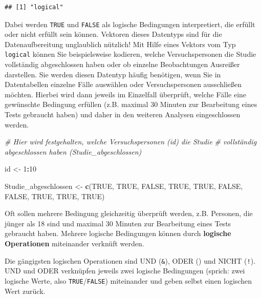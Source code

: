 \documentclass[
  ngerman,
]{book}
\newenvironment{Shaded}{\begin{snugshade}}{\end{snugshade}}
\newcommand{\CommentTok}[1]{\textcolor[rgb]{0.56,0.35,0.01}{\textit{#1}}}
\newcommand{\ConstantTok}[1]{\textcolor[rgb]{0.56,0.35,0.01}{#1}}
\newcommand{\DecValTok}[1]{\textcolor[rgb]{0.00,0.00,0.81}{#1}}
\newcommand{\FunctionTok}[1]{\textcolor[rgb]{0.13,0.29,0.53}{\textbf{#1}}}
\newcommand{\NormalTok}[1]{#1}
\newcommand{\OtherTok}[1]{\textcolor[rgb]{0.56,0.35,0.01}{#1}}
\newcommand{\SpecialCharTok}[1]{\textcolor[rgb]{0.81,0.36,0.00}{\textbf{#1}}}
\begin{document}
\begin{verbatim}
## [1] "logical"
\end{verbatim}

Dabei werden \texttt{TRUE} und \texttt{FALSE} als logische Bedingungen interpretiert, die erfüllt oder nicht erfüllt sein können. Vektoren dieses Datentyps sind für die Datenaufbereitung unglaublich nützlich! Mit Hilfe eines Vektors vom Typ \texttt{logical} können Sie beispielsweise kodieren, welche Versuchspersonen die Studie vollständig abgeschlossen haben oder ob einzelne Beobachtungen Ausreißer darstellen. Sie werden diesen Datentyp häufig benötigen, wenn Sie in Datentabellen einzelne Fälle auswählen oder Versuchspersonen ausschließen möchten. Hierbei wird dann jeweils im Einzelfall überprüft, welche Fälle eine gewünschte Bedingung erfüllen (z.B. maximal 30 Minuten zur Bearbeitung eines Tests gebraucht haben) und daher in den weiteren Analysen eingeschlossen werden.

\begin{Shaded}
\begin{Highlighting}[]
\CommentTok{\# Hier wird festgehalten, welche Versuchspersonen (id) die Studie }
\CommentTok{\# vollständig abgeschlossen haben (Studie\_abgeschlossen)}

\NormalTok{id }\OtherTok{\textless{}{-}} \DecValTok{1}\SpecialCharTok{:}\DecValTok{10}

\NormalTok{Studie\_abgeschlossen }\OtherTok{\textless{}{-}} \FunctionTok{c}\NormalTok{(}\ConstantTok{TRUE}\NormalTok{, }\ConstantTok{TRUE}\NormalTok{, }\ConstantTok{FALSE}\NormalTok{, }\ConstantTok{TRUE}\NormalTok{, }\ConstantTok{TRUE}\NormalTok{, }\ConstantTok{FALSE}\NormalTok{, }\ConstantTok{FALSE}\NormalTok{, }\ConstantTok{TRUE}\NormalTok{, }\ConstantTok{TRUE}\NormalTok{, }\ConstantTok{TRUE}\NormalTok{) }
\end{Highlighting}
\end{Shaded}

Oft sollen mehrere Bedingung gleichzeitig überprüft werden, z.B. Personen, die jünger als 18 sind und maximal 30 Minuten zur Bearbeitung eines Tests gebraucht haben. Mehrere logische Bedingungen können durch \textbf{logische Operationen} miteinander verknüft werden.

Die gängigsten logischen Operationen sind UND (\texttt{\&}), ODER (\texttt{\textbar{}}) und NICHT (\texttt{!}). UND und ODER
verknüpfen jeweils zwei logische Bedingungen (sprich: zwei logische Werte, also \texttt{TRUE}/\texttt{FALSE}) miteinander und geben selbst einen logischen Wert zurück.
\end{document}
